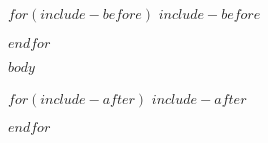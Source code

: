 \documentclass[
$if(fontsize)$
  $fontsize$,
$else$
  12pt,
$endif$
$if(papersize)$
  $papersize$paper,
$endif$
$for(classoption)$
  $classoption$$sep$,
$endfor$
]{$documentclass$}
\begin{document}
$for(include-before)$
$include-before$

$endfor$
\centering

$body$

$for(include-after)$
$include-after$

$endfor$
\end{document}
